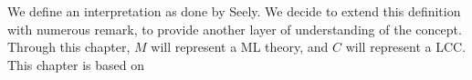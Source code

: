We define an interpretation as done by Seely. We decide to extend this definition with numerous remark, to provide another layer of understanding of the concept. Through this chapter, $M$ will represent a ML theory, and $C$ will represent a LCC. This chapter is based on \cite[Section 4]{seely1984locally}



